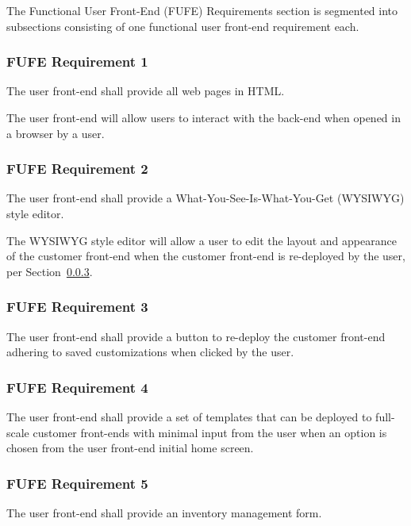 \documentclass{article}
\begin{document}
The Functional User Front-End (FUFE) Requirements section is segmented into
subsections consisting of one functional user front-end requirement each.

\subsubsection{FUFE Requirement 1}
\label{func-user-front-end-1}

The user front-end shall provide all web pages in HTML.

The user front-end will allow users to interact with the back-end when opened in
a browser by a user.

\subsubsection{FUFE Requirement 2}
\label{func-user-front-end-2}

The user front-end shall provide a What-You-See-Is-What-You-Get (WYSIWYG) style
editor.

The WYSIWYG style editor will allow a user to edit the layout and appearance of
the customer front-end when the customer front-end is re-deployed by the user,
per Section~\ref{func-user-front-end-3}.

\subsubsection{FUFE Requirement 3}
\label{func-user-front-end-3}

The user front-end shall provide a button to re-deploy the customer front-end
adhering to saved customizations when clicked by the user.

\subsubsection{FUFE Requirement 4}
\label{func-user-front-end-4}

The user front-end shall provide a set of templates that can be deployed to
full-scale customer front-ends with minimal input from the user when an option
is chosen from the user front-end initial home screen.

\subsubsection{FUFE Requirement 5}
\label{func-user-front-end-5}

The user front-end shall provide an inventory management form.
\end{document}
